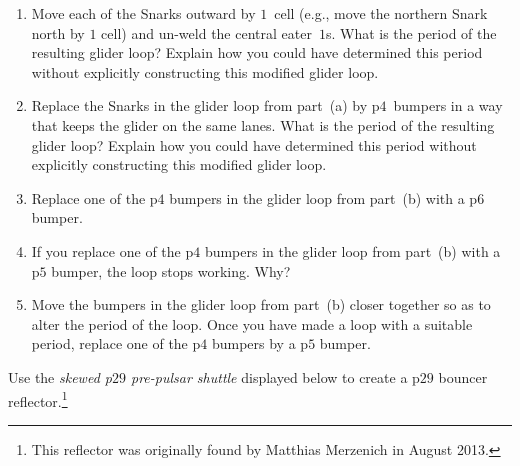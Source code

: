 \begin{multicols}{2}
\begin{problem}
	\begin{enumerate}[label=\bf\color{ocre}(\alph*)]
		\item Move each of the Snarks outward by $1$~cell (e.g., move the northern Snark north by $1$ cell) and un-weld the central eater~$1$s. What is the period of the resulting glider loop? Explain how you could have determined this period without explicitly constructing this modified glider loop.
		
		\item Replace the Snarks in the glider loop from part~(a) by p$4$~bumpers in a way that keeps the glider on the same lanes. What is the period of the resulting glider loop? Explain how you could have determined this period without explicitly constructing this modified glider loop.
		
		\item Replace one of the p$4$ bumpers in the glider loop from part~(b) with a p$6$ bumper.
		
		\item If you replace one of the p$4$ bumpers in the glider loop from part~(b) with a p$5$ bumper, the loop stops working. Why?
		
		\item Move the bumpers in the glider loop from part~(b) closer together so as to alter the period of the loop. Once you have made a loop with a suitable period, replace one of the p$4$ bumpers by a p$5$ bumper.
	
		\noindent\begin{minipage}{\linewidth}
			\centering
			\label{fig:minimum_snark_loop}\medskip
		\end{minipage}
	\end{enumerate}
\end{problem}


\mfilbreak


\begin{problem}\label{exer:p29_pipsquirter}
	Use the \emph{skewed p$29$ pre-pulsar shuttle} displayed below to create a p$29$ bouncer reflector.\footnote{This reflector was originally found by Matthias Merzenich in August 2013.}
	
	\begin{center}
	\end{center}
\end{problem}



\end{multicols}
